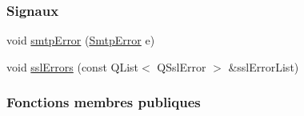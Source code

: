 \subsubsection*{Signaux}
\begin{DoxyCompactItemize}
\item 
void \hyperlink{class_simple_mail_1_1_sender_aa5805003921ffc7bb9d5643aedd84c6a}{smtp\+Error} (\hyperlink{class_simple_mail_1_1_sender_a276560e9e955ab6be451338c3776bf49}{Smtp\+Error} e)
\item 
void \hyperlink{class_simple_mail_1_1_sender_a8b87c2e54a9dcd225495536cebc4fb27}{ssl\+Errors} (const Q\+List$<$ Q\+Ssl\+Error $>$ \&ssl\+Error\+List)
\end{DoxyCompactItemize}
\subsubsection*{Fonctions membres publiques}
